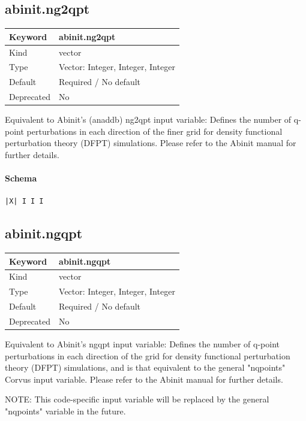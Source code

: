 \documentclass[11pt]{article}
\begin{document}
\subsection{abinit.ng2qpt}
\label{kw:abinit-ng2qpt}
\begin{longtable}{|p{1.5in}|p{4.5in}|}
\hline
Keyword & abinit.ng2qpt \\
\hline
Kind & vector \\
\hline
Type & Vector: Integer, Integer, Integer \\
\hline
Default & Required / No default \\
\hline
Deprecated & No \\
\hline
\end{longtable}
 Equivalent to Abinit's (anaddb) ng2qpt input variable: Defines the number of
 q-point perturbations in each direction of the finer grid for density
 functional perturbation theory (DFPT) simulations. Please refer to the
 Abinit manual for further details.

\paragraph{Schema}
\begin{Verbatim}
|X| I I I
\end{Verbatim}

\subsection{abinit.ngqpt}
\label{kw:abinit-ngqpt}
\begin{longtable}{|p{1.5in}|p{4.5in}|}
\hline
Keyword & abinit.ngqpt \\
\hline
Kind & vector \\
\hline
Type & Vector: Integer, Integer, Integer \\
\hline
Default & Required / No default \\
\hline
Deprecated & No \\
\hline
\end{longtable}
 Equivalent to Abinit's ngqpt input variable: Defines the number of q-point
 perturbations in each direction of the grid for density functional
 perturbation theory (DFPT) simulations, and is that equivalent to the general
 "nqpoints" Corvus input variable. Please refer to the Abinit manual for
 further details.

 NOTE: This code-specific input variable will be replaced by the general
 "nqpoints" variable in the future.
\end{document}
